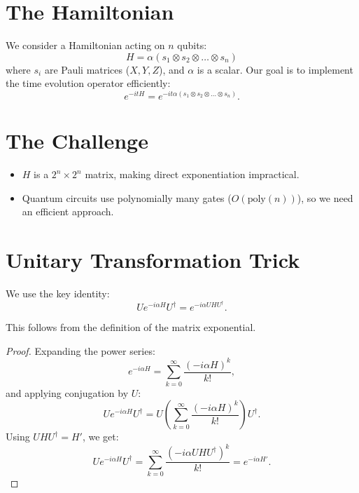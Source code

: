 \documentclass{article}
\begin{document}
\section{The Hamiltonian}
We consider a Hamiltonian acting on $n$ qubits:
\begin{equation}
  H = \alpha (s_1 \otimes s_2 \otimes \dots \otimes s_n)
\end{equation}
where $s_i$ are Pauli matrices ($X, Y, Z$), and $\alpha$ is a scalar. Our goal is to implement the time evolution operator efficiently:
\begin{equation}
  e^{-itH} = e^{-it\alpha (s_1 \otimes s_2 \otimes \dots \otimes s_n)}.
\end{equation}

\section{The Challenge}
\begin{itemize}
\item $H$ is a $2^n \times 2^n$ matrix, making direct exponentiation impractical.
\item Quantum circuits use polynomially many gates ($O(\text{poly}(n))$), so we need an efficient approach.
\end{itemize}

\section{Unitary Transformation Trick}
We use the key identity:
\begin{equation}
  U e^{-i\alpha H} U^\dagger = e^{-i\alpha UHU^\dagger}.
\end{equation}

This follows from the definition of the matrix exponential.

\begin{proof}
  Expanding the power series:
  \begin{equation}
    e^{-i\alpha H} = \sum_{k=0}^{\infty} \frac{(-i\alpha H)^k}{k!},
  \end{equation}
  and applying conjugation by $U$:
  \begin{equation}
    U e^{-i\alpha H} U^\dagger = U \left( \sum_{k=0}^{\infty} \frac{(-i\alpha H)^k}{k!} \right) U^\dagger.
  \end{equation}
  Using $UHU^\dagger = H'$, we get:
  \begin{equation}
    U e^{-i\alpha H} U^\dagger = \sum_{k=0}^{\infty} \frac{(-i\alpha UHU^\dagger)^k}{k!} = e^{-i\alpha H'}.
  \end{equation}
  
\end{proof}
\end{document}
